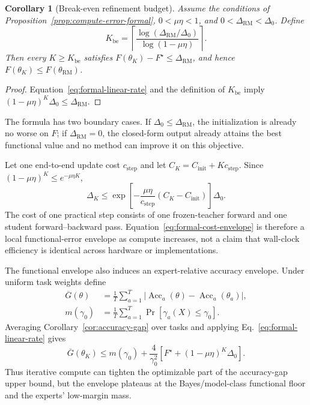 \documentclass[letterpaper]{article} %
\theoremstyle{plain}
\newtheorem{corollary}[theorem]{Corollary}
\theoremstyle{definition}
\begin{document}
\begin{corollary}[Break-even refinement budget]
\label{cor:break-even-formal}
Assume the conditions of Proposition~\ref{prop:compute-error-formal}, $0<\mu\eta<1$, and $0<\Delta_{\mathrm{RM}}<\Delta_0$.
Define
\begin{equation}
K_{\mathrm{be}}
=
\left\lceil
\frac{\log(\Delta_{\mathrm{RM}}/\Delta_0)}
     {\log(1-\mu\eta)}
\right\rceil.
\label{eq:formal-break-even}
\end{equation}
Then every $K\ge K_{\mathrm{be}}$ satisfies $F(\theta_K)-F^\star\le\Delta_{\mathrm{RM}}$, and hence $F(\theta_K)\le F(\theta_{\mathrm{RM}})$.
\end{corollary}

\begin{proof}
Equation~\eqref{eq:formal-linear-rate} and the definition of $K_{\mathrm{be}}$ imply $(1-\mu\eta)^K\Delta_0\le\Delta_{\mathrm{RM}}$.
\end{proof}

The formula has two boundary cases.
If $\Delta_0\le\Delta_{\mathrm{RM}}$, the initialization is already no worse on $F$; if $\Delta_{\mathrm{RM}}=0$, the closed-form output already attains the best functional value and no method can improve it on this objective.

Let one end-to-end update cost $c_{\mathrm{step}}$ and let $C_K=C_{\mathrm{init}}+Kc_{\mathrm{step}}$.
Since $(1-\mu\eta)^K\le e^{-\mu\eta K}$,
\begin{equation}
\Delta_K
\le
\exp\!\left[-\frac{\mu\eta}{c_{\mathrm{step}}}
(C_K-C_{\mathrm{init}})\right]\Delta_0.
\label{eq:formal-cost-envelope}
\end{equation}
The cost of one practical step consists of one frozen-teacher forward and one student forward--backward pass.
Equation~\eqref{eq:formal-cost-envelope} is therefore a local functional-error envelope as compute increases, not a claim that wall-clock efficiency is identical across hardware or implementations.

The functional envelope also induces an expert-relative accuracy envelope.
Under uniform task weights define
\begin{align}
\overline G(\theta)
&=\frac1T\sum_{a=1}^T
\left|\operatorname{Acc}_a(\theta)-\operatorname{Acc}_a(\theta_a)\right|,\\
m(\gamma_0)
&=\frac1T\sum_{a=1}^T\Pr[\gamma_a(X)\le\gamma_0].
\end{align}
Averaging Corollary~\ref{cor:accuracy-gap} over tasks and applying Eq.~\eqref{eq:formal-linear-rate} gives
\begin{equation}
\overline G(\theta_K)
\le
m(\gamma_0)
+\frac{4}{\gamma_0^2}
\left[F^\star+(1-\mu\eta)^K\Delta_0\right].
\label{eq:accuracy-compute-envelope}
\end{equation}
Thus iterative compute can tighten the optimizable part of the accuracy-gap upper bound, but the envelope plateaus at the Bayes/model-class functional floor and the experts' low-margin mass.
\end{document}
